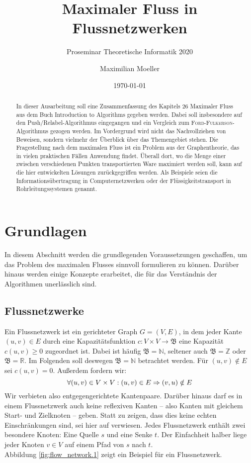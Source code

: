 \documentclass[12pt,a4paper,titlepage,onecolumn,ngerman,bibliography=totocnumbered]{scrartcl}
\author{Maximilian Moeller}
\title{Maximaler Fluss in Flussnetzwerken}
\subtitle{Proseminar Theoretische Informatik 2020}
\date{\today}
\theoremstyle{definition}
\theoremstyle{remark}
\newcommand{\ff}{\textsc{Ford-Fulkerson}}
\newcommand{\pr}{Push/Relabel}
\begin{document}
\maketitle
\tableofcontents

\begin{abstract}
	In dieser Ausarbeitung soll eine Zusammenfassung des Kapitels 26 \glqq Maximaler Fluss\grqq{} aus dem Buch \glqq Introduction to Algorithms\grqq{} \parencite{Cormen09} gegeben werden.
	Dabei soll insbesondere auf den \pr -Algorithmus eingegangen und ein Vergleich zum \ff -Algorithmus gezogen werden.
	Im Vordergrund wird nicht das Nachvollziehen von Beweisen, sondern vielmehr der Überblick über das Themengebiet stehen.
	\medbreak
	Die Fragestellung nach dem maximalen Fluss ist ein Problem aus der Graphentheorie, das
	in vielen praktischen Fällen Anwendung findet.
	Überall dort, wo die Menge einer zwischen verschiedenen Punkten transportierten Ware maximiert werden soll, kann auf die hier entwickelten Lösungen zurückgegriffen werden.
	Als Beispiele seien die Informationsübertragung in Computernetzwerken oder der Flüssigkeitstransport in Rohrleitungssystemen genannt.
\end{abstract}

\section{Grundlagen}
In diesem Abschnitt werden die grundlegenden Voraussetzungen geschaffen, um das Problem des maximalen Flusses sinnvoll formulieren zu können.
Darüber hinaus werden einige Konzepte erarbeitet, die für das Verständnis der Algorithmen unerlässlich sind.

\subsection{Flussnetzwerke}
Ein Flussnetzwerk ist ein gerichteter Graph $G = (V,E)$, in dem jeder Kante $(u,v) \in E$ durch eine Kapazitätsfunktion $c: V\times V\to\mathfrak{B}$ eine Kapazität $c(u,v) \geq 0$ zugeordnet ist.
Dabei ist häufig $\mathfrak{B} = \mathbb{N}$, seltener auch $\mathfrak{B} = \mathbb{Z}$ oder $\mathfrak{B} = \mathbb{R}$.
Im Folgenden soll deswegen $\mathfrak{B} = \mathbb{N}$ betrachtet werden.
Für $(u,v) \notin E$ sei $c(u,v) = 0$.
Außerdem fordern wir:
\begin{equation} \label{no_parallel}
	\forall (u,v)\in V\times V: (u,v)\in E \Rightarrow (v,u)\notin E\\
\end{equation}
Wir verbieten also entgegengerichtete Kantenpaare.
Darüber hinaus darf es in einem Flussnetzwerk auch keine reflexiven Kanten -- also Kanten mit gleichem Start- und Zielknoten -- geben.
Statt zu zeigen, dass dies keine echten Einschränkungen sind, sei hier auf \cite[][S. 724 f.]{Cormen09} verwiesen.
\medbreak
Jedes Flussnetzwerk enthält zwei besondere Knoten: Eine Quelle $s$ und eine Senke $t$.
Der Einfachheit halber liege jeder Knoten $v \in V$ auf einem Pfad von $s$ nach $t$.\\
Abbildung \ref{fig:flow_network.1} zeigt ein Beispiel für ein Flussnetzwerk.
\end{document}

